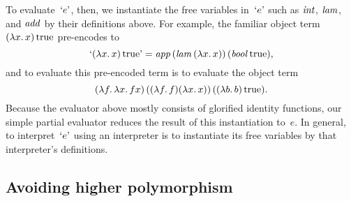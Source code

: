 To evaluate~$\encode{e}$, then, we
instantiate the free variables in~$\encode{e}$ such as $\ident{int}$,
$\ident{lam}$, and $\ident{add}$ by their definitions above.  For
example, the familiar object term $(\fun{x}x)\True$ pre-encodes to
\begin{equation*}
    \encode{(\fun{x}x)\True} = \ident{app}
    (\ident{lam} (\fun{x} x))\, (\ident{bool} \True),
\end{equation*}
and to evaluate this pre-encoded term is to evaluate the object term
\begin{equation*}
    (\fun{f} \fun{x} fx) \,
    ((\fun{f} f) (\fun{x} x))\, ((\fun{b} b) \True).
\end{equation*}
Because the evaluator above mostly consists of glorified identity
functions, our simple partial evaluator reduces the
result of this instantiation to~$e$.  In general, to
interpret~$\encode{e}$ using an interpreter is to instantiate its free
variables by that interpreter's definitions.

\subsection{Avoiding higher polymorphism}


